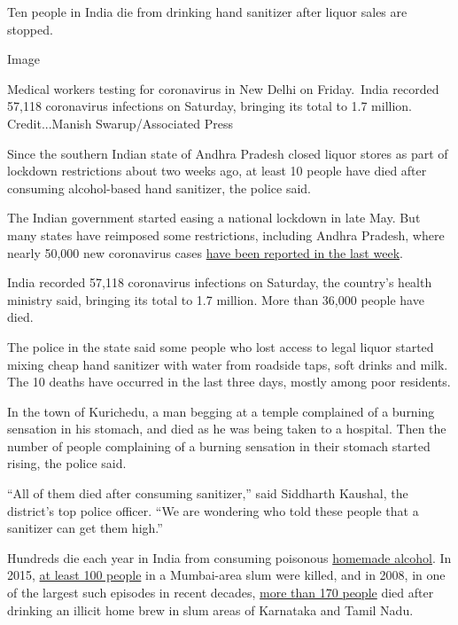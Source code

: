 Ten people in India die from drinking hand sanitizer after liquor sales
are stopped.

Image

Medical workers testing for coronavirus in New Delhi on Friday.~India
recorded 57,118 coronavirus infections on Saturday, bringing its total
to 1.7 million. Credit...Manish Swarup/Associated Press

Since the southern Indian state of Andhra Pradesh closed liquor stores
as part of lockdown restrictions about two weeks ago, at least 10 people
have died after consuming alcohol-based hand sanitizer, the police said.

The Indian government started easing a national lockdown in late May.
But many states have reimposed some restrictions, including Andhra
Pradesh, where nearly 50,000 new coronavirus cases
\href{https://www.nytimes.com/interactive/2020/world/asia/india-coronavirus-cases.html\#cases}{have
been reported in the last week}.

India recorded 57,118 coronavirus infections on Saturday, the country's
health ministry said, bringing its total to 1.7 million. More than
36,000 people have died.

The police in the state said some people who lost access to legal liquor
started mixing cheap hand sanitizer with water from roadside taps, soft
drinks and milk. The 10 deaths have occurred in the last three days,
mostly among poor residents.

In the town of Kurichedu, a man begging at a temple complained of a
burning sensation in his stomach, and died as he was being taken to a
hospital. Then the number of people complaining of a burning sensation
in their stomach started rising, the police said.

``All of them died after consuming sanitizer,'' said Siddharth Kaushal,
the district's top police officer. ``We are wondering who told these
people that a sanitizer can get them high.''

Hundreds die each year in India from consuming poisonous
\href{https://www.nytimes.com/2019/02/11/world/asia/india-toxic-alcohol.html}{homemade
alcohol}. In 2015,
\href{https://www.bbc.com/news/world-asia-india-33224514}{at least 100
people} in a Mumbai-area slum were killed, and in 2008, in one of the
largest such episodes in recent decades,
\href{https://timesofindia.indiatimes.com/city/chennai/TN-hooch-tragedy-21-cops-suspended/articleshow/3159848.cms?referral=PM}{more
than 170 people} died after drinking an illicit home brew in slum areas
of Karnataka and Tamil Nadu.


